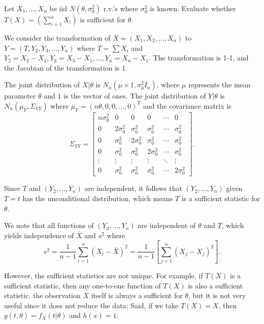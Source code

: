\begin{example}
    Let $X_1, \ldots, X_n$ be iid $N(\theta, \sigma_0^2)$ r.v.'s where $\sigma_0^2$ is known. Evaluate whether $T(X) = \left(\sum_{i=1}^n X_i\right)$ is sufficient for $\theta$.
\end{example}
\begin{solution}
    We consider the transformation of $X = (X_1, X_2, \ldots, X_n)$ to $Y = (T, Y_2, Y_3, \ldots, Y_n)$ where $T = \sum X_i$ and $Y_2 = X_2 - X_1, Y_3 = X_3 - X_1, \ldots, Y_n = X_n - X_1$. The transformation is 1-1, and the Jacobian of the transformation is 1.

    The joint distribution of $X | \theta$ is $N_n(\mu \times 1, \sigma_0^2 I_n)$, where $\mu$ represents the mean parameter $\theta$ and $1$ is the vector of ones. The joint distribution of $Y | \theta$ is $N_n(\mu_Y, \Sigma_{YY})$ where $\mu_Y = (n\theta, 0, 0, \ldots, 0)^T$ and the covariance matrix is
    \[
    \Sigma_{YY} = \left[\begin{array}{c|ccccc}
        n\sigma_0^2 & 0 & 0 & 0 & \cdots & 0 \\[0.5em]
        \hline
        0 & 2\sigma_0^2 & \sigma_0^2 & \sigma_0^2 & \cdots & \sigma_0^2 \\[0.5em]
        0 & \sigma_0^2 & 2\sigma_0^2 & \sigma_0^2 & \cdots & \sigma_0^2 \\[0.5em]
        0 & \sigma_0^2 & \sigma_0^2 & 2\sigma_0^2 & \cdots & \sigma_0^2 \\[0.5em]
        \vdots & \vdots & \vdots & \vdots & \ddots & \vdots \\[0.5em]
        0 & \sigma_0^2 & \sigma_0^2 & \sigma_0^2 & \cdots & 2\sigma_0^2
    \end{array}\right].
    \]

    Since $T$ and $(Y_2, \ldots, Y_n)$ are independent, it follows that $(Y_2, \ldots, Y_n)$ given $T = t$ has the unconditional distribution, which means $T$ is a sufficient statistic for $\theta$. 

    We note that all functions of $(Y_2, \ldots, Y_n)$ are independent of $\theta$ and $T$, which yields independence of $\bar{X}$ and $s^2$ where 
    \[
        s^2 = \frac{1}{n-1}\sum_{i=1}^n (X_i - \bar{X})^2 = \frac{1}{n-1}\left[\sum_{j=1}^n (X_j - X_j)^2\right].
    \]
\end{solution}

However, the sufficient statistics are not unique. For example, if $T(X)$ is a sufficient statistic, then any one-to-one function of $T(X)$ is also a sufficient statistic.
the observation $X$ itself is always a sufficient for $\theta$, but it is not very useful since it does not reduce the data; 
Said, if we take $T(X) = X$, then $g(t, \theta) = f_X(t|\theta)$ and $h(x) = 1$.

